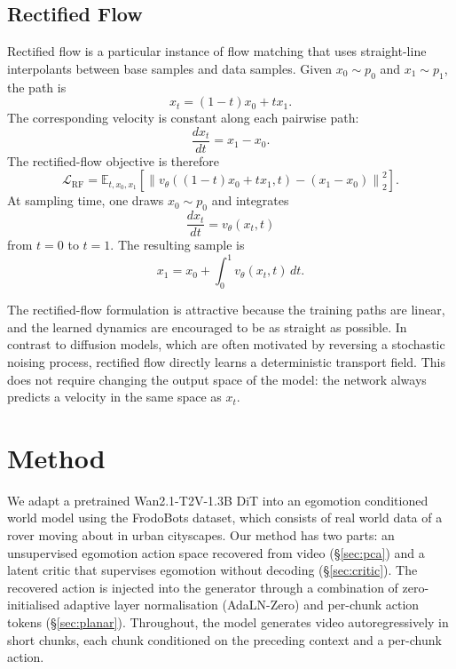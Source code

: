 \documentclass[letterpaper]{article} %
\begin{document}
\subsection{Rectified Flow}

Rectified flow is a particular instance of flow matching that uses straight-line interpolants between base samples and data samples. Given $x_0 \sim p_0$ and $x_1 \sim p_1$, the path is
\begin{equation}
    x_t = (1-t)x_0 + t x_1.
    \label{eq:rf_path}
\end{equation}
The corresponding velocity is constant along each pairwise path:
\begin{equation}
    \frac{d x_t}{dt} = x_1 - x_0.
    \label{eq:rf_velocity}
\end{equation}
The rectified-flow objective is therefore
\begin{equation}
    \mathcal{L}_{\mathrm{RF}}
    =
    \mathbb{E}_{t,x_0,x_1}
    \left[
        \left\|
            v_\theta((1-t)x_0+t x_1,t)
            -
            (x_1-x_0)
        \right\|_2^2
    \right].
    \label{eq:rf_loss}
\end{equation}
At sampling time, one draws $x_0 \sim p_0$ and integrates
\begin{equation}
    \frac{d x_t}{dt}=v_\theta(x_t,t)
\end{equation}
from $t=0$ to $t=1$. The resulting sample is
\begin{equation}
    x_1
    =
    x_0
    +
    \int_0^1 v_\theta(x_t,t)\,dt.
    \label{eq:rf_sample}
\end{equation}

The rectified-flow formulation is attractive because the training paths are linear, and the learned dynamics are encouraged to be as straight as possible. In contrast to diffusion models, which are often motivated by reversing a stochastic noising process, rectified flow directly learns a deterministic transport field. This does not require changing the output space of the model: the network always predicts a velocity in the same space as $x_t$.

\section{Method}

We adapt a pretrained Wan2.1-T2V-1.3B DiT into an egomotion conditioned world model using the FrodoBots dataset, which consists of real world data of a rover moving about in urban cityscapes. Our method has two parts: an unsupervised egomotion action space recovered from video (\S\ref{sec:pca}) and a latent critic that supervises egomotion without decoding (\S\ref{sec:critic}). The recovered action is injected into the generator through a combination of zero-initialised adaptive layer normalisation (AdaLN-Zero) and per-chunk action tokens (\S\ref{sec:planar}). Throughout, the model generates video autoregressively in short chunks, each chunk conditioned on the preceding context and a per-chunk action.
\end{document}
